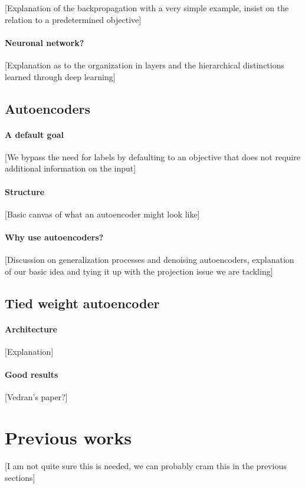 \documentclass{article}
\begin{document}
[Explanation of the backpropagation with a very simple example, insist on the relation to a predetermined objective]

\paragraph{Neuronal network?}

[Explanation as to the organization in layers and the hierarchical distinctions learned through deep learning]

\subsection{Autoencoders}

\paragraph{A default goal}
[We bypass the need for labels by defaulting to an objective that does not require additional information on the input]

\paragraph{Structure}
[Basic canvas of what an autoencoder might look like]

\paragraph{Why use autoencoders?}
[Discussion on generalization processes and denoising autoencoders, explanation of our basic idea and tying it up with the projection issue we are tackling]

\subsection{Tied weight autoencoder}

\paragraph{Architecture}
[Explanation]

\paragraph{Good results}
[Vedran's paper?]

\section{Previous works}

[I am not quite sure this is needed, we can probably cram this in the previous sections]
 
\end{document}

